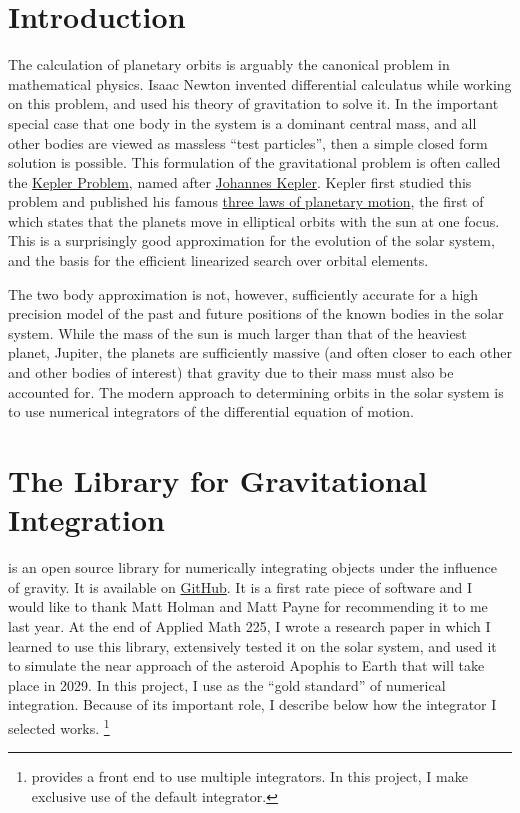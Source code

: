 \section{Introduction}
\label{section_intro}
The calculation of planetary orbits is arguably the canonical problem in mathematical physics.
Isaac Newton invented differential calculatus while working on this problem, and used his theory of gravitation to solve it.
In the important special case that one body in the system is a dominant central mass,
and all other bodies are viewed as massless ``test particles'', then a simple closed form solution is possible.
This formulation of the gravitational problem is often called the \href{https://en.wikipedia.org/wiki/Kepler_problem}{Kepler Problem},
named after \href{https://en.wikipedia.org/wiki/Johannes_Kepler}{Johannes Kepler}.
Kepler first studied this problem and published his famous \href{https://en.wikipedia.org/wiki/Kepler\%27s_laws_of_planetary_motion}{three laws of planetary motion},
the first of which states that the planets move in elliptical orbits with the sun at one focus.
This is a surprisingly good approximation for the evolution of the solar system, and the basis for the efficient linearized search over orbital elements.

The two body approximation is not, however, sufficiently accurate for a high precision model of the past and future positions of the known bodies in the solar system.
While the mass of the sun is much larger than that of the heaviest planet, Jupiter, the planets are sufficiently massive
(and often closer to each other and other bodies of interest) that gravity due to their mass must also be accounted for.
The modern approach to determining orbits in the solar system is to use numerical integrators of the differential equation of motion.

\section{The  Library for Gravitational Integration}
 is an open source library for numerically integrating objects under the influence of gravity.
It is available on \href{https://github.com/hannorein/rebound}{GitHub}.
It is a first rate piece of software and I would like to thank Matt Holman and Matt Payne for recommending it to me last year.
At the end of Applied Math 225, I wrote a research paper in which I learned to use this library, 
extensively tested it on the solar system, and used it to simulate the near approach of the asteroid Apophis to Earth that will take place in 2029.
In this project, I use  as the ``gold standard'' of numerical integration.
Because of its important role, I describe below how the  integrator I selected works.
\footnote{ provides a front end to use multiple integrators. In this project, I make exclusive use of the default  integrator.}

